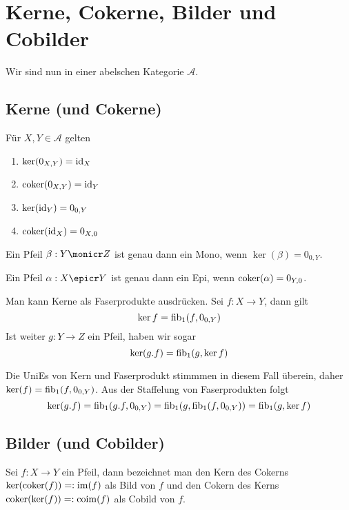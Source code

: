 \section{Kerne, Cokerne, Bilder und Cobilder}

Wir sind nun in einer abelschen Kategorie $\mathcal A$.

\subsection{Kerne (und Cokerne)}


\begin{prop}
Für $X,Y \in \mathcal A$ gelten
\begin{enumerate}
\item $\ker(0_{X,Y}) = \operatorname{id}_X$
\item $\operatorname{coker}(0_{X,Y}) = \operatorname{id}_Y$
\item $\ker(\operatorname{id}_Y) = 0_{0,Y}$
\item $\operatorname{coker}(\operatorname{id}_X) = 0_{X,0}$
\end{enumerate}
\end{prop}

\begin{prop}
Ein Pfeil $\beta : Y \monicr Z$ ist genau dann ein Mono, wenn $\ker(\beta) = 0_{0,Y}$.

Ein Pfeil $\alpha : X \epicr Y$ ist genau dann ein Epi, wenn $\operatorname{coker}(\alpha) = 0_{Y,0}$.
\end{prop}

\begin{prop}
Man kann Kerne als Faserprodukte ausdrücken. Sei $f : X\to Y$, dann gilt
\[\ker f = \operatorname{fib}_1(f,0_{0,Y}) \]
Ist weiter $g : Y\to Z$ ein Pfeil, haben wir sogar
\[ \ker(g.f) = \operatorname{fib}_1(g,\ker f) \]
\end{prop}
\begin{bew}
Die UniEs von Kern und Faserprodukt stimmmen in diesem Fall überein, daher $\ker(f) = \operatorname{fib}_1(f,0_{0,Y})$.
Aus der Staffelung von Faserprodukten folgt
\[\ker(g.f) = \operatorname{fib}_1(g.f,0_{0,Y}) = \operatorname{fib}_1(g,\operatorname{fib}_1(f,0_{0,Y})) = \operatorname{fib}_1(g,\ker f)\]
\end{bew}

\subsection{Bilder (und Cobilder)}

\begin{defn}
Sei $f : X\to Y$ ein Pfeil, dann bezeichnet man den Kern des Cokerns $\ker(\operatorname{coker}(f)) =: \operatorname{im}(f)$ als Bild von $f$
und den Cokern des Kerns $\operatorname{coker}(\ker(f)) =: \operatorname{coim}(f)$ als Cobild von $f$.
\end{defn}

